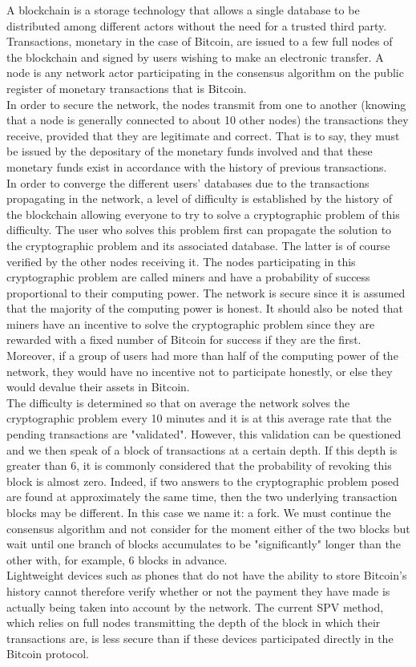 \documentclass[12pt,a4paper]{article}
\begin{document}
	A blockchain is a storage technology that allows a single database to be distributed among different actors without the need for a trusted third party. Transactions, monetary in the case of Bitcoin, are issued to a few full nodes of the blockchain and signed by users wishing to make an electronic transfer. A node is any network actor participating in the consensus algorithm on the public register of monetary transactions that is Bitcoin.\\
	In order to secure the network, the nodes transmit from one to another (knowing that a node is generally connected to about 10 other nodes) the transactions they receive, provided that they are legitimate and correct. That is to say, they must be issued by the depositary of the monetary funds involved and that these monetary funds exist in accordance with the history of previous transactions.\\
	In order to converge the different users' databases due to the transactions propagating in the network, a level of difficulty is established by the history of the blockchain allowing everyone to try to solve a cryptographic problem of this difficulty. The user who solves this problem first can propagate the solution to the cryptographic problem and its associated database. The latter is of course verified by the other nodes receiving it. The nodes participating in this cryptographic problem are called miners and have a probability of success proportional to their computing power. The network is secure since it is assumed that the majority of the computing power is honest. It should also be noted that miners have an incentive to solve the cryptographic problem since they are rewarded with a fixed number of Bitcoin for success if they are the first. Moreover, if a group of users had more than half of the computing power of the network, they would have no incentive not to participate honestly, or else they would devalue their assets in Bitcoin.\\
	The difficulty is determined so that on average the network solves the cryptographic problem every 10 minutes and it is at this average rate that the pending transactions are "validated". However, this validation can be questioned and we then speak of a block of transactions at a certain depth. If this depth is greater than 6, it is commonly considered that the probability of revoking this block is almost zero. Indeed, if two answers to the cryptographic problem posed are found at approximately the same time, then the two underlying transaction blocks may be different. In this case we name it: a fork. We must continue the consensus algorithm and not consider for the moment either of the two blocks but wait until one branch of blocks accumulates to be "significantly" longer than the other with, for example, 6 blocks in advance.\\
	Lightweight devices such as phones that do not have the ability to store Bitcoin's history cannot therefore verify whether or not the payment they have made is actually being taken into account by the network. The current SPV method, which relies on full nodes transmitting the depth of the block in which their transactions are, is less secure than if these devices participated directly in the Bitcoin protocol.
		
\end{document}
